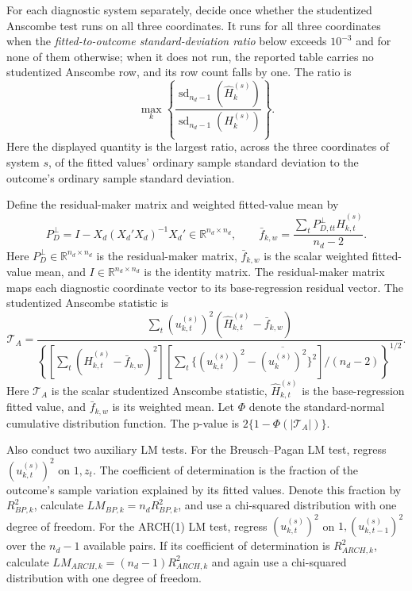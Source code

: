 \documentclass[11pt]{article}
\begin{document}
For each diagnostic system separately, decide once whether the studentized Anscombe test runs on all three
coordinates. It runs for all three coordinates when the \emph{fitted-to-outcome standard-deviation ratio} below exceeds \(10^{-3}\) and for none of them otherwise; when it does not
run, the reported table carries no studentized Anscombe row, and its row count falls by one. The ratio is
\[
\max_k\left\{\frac{\operatorname{sd}_{n_d-1}(\widehat H_k^{(s)})}
{\operatorname{sd}_{n_d-1}(H_k^{(s)})}\right\}.
\]
Here the displayed quantity is the largest ratio, across the three coordinates of system \(s\), of the fitted values'
ordinary sample standard deviation to the outcome's ordinary sample standard deviation.

Define the residual-maker matrix and weighted fitted-value mean by
\[
 P_D^\perp=I-X_d(X_d'X_d)^{-1}X_d'\in\mathbb R^{n_d\times n_d},
 \qquad
 \bar f_{k,w}=\frac{\sum_t P_{D,tt}^\perp\widehat H_{k,t}^{(s)}}{n_d-2}.
\]
Here \(P_D^\perp\in\mathbb R^{n_d\times n_d}\) is the residual-maker matrix,
\(\bar f_{k,w}\) is the scalar weighted fitted-value mean, and
\(I\in\mathbb R^{n_d\times n_d}\) is the identity matrix. The residual-maker matrix maps each
diagnostic coordinate vector to its base-regression residual vector.
The studentized Anscombe statistic is
\[
 \mathcal T_A=\frac{\sum_t(u_{k,t}^{(s)})^2(\widehat H_{k,t}^{(s)}-\bar f_{k,w})}
 {\left\{[\sum_t(\widehat H_{k,t}^{(s)}-\bar f_{k,w})^2]
 [\sum_t\{(u_{k,t}^{(s)})^2-\overline{(u_k^{(s)})^2}\}^2]/(n_d-2)\right\}^{1/2}}.
\]
Here \(\mathcal T_A\) is the scalar studentized Anscombe statistic,
\(\widehat H_{k,t}^{(s)}\) is the base-regression fitted value, and \(\bar f_{k,w}\) is its weighted mean.
Let \(\Phi\) denote the standard-normal cumulative distribution function. The p-value is
\(2\{1-\Phi(|\mathcal T_A|)\}\).

Also conduct two auxiliary LM tests. For the Breusch--Pagan LM test, regress
\((u_{k,t}^{(s)})^2\) on \(1,z_t\). The coefficient of determination is the fraction of the
outcome's sample variation explained by its fitted values. Denote this fraction by
\(R^2_{BP,k}\), calculate \(LM_{BP,k}=n_dR^2_{BP,k}\), and use a chi-squared distribution with one
degree of freedom. For the ARCH(1) LM test, regress \((u_{k,t}^{(s)})^2\) on
\(1,(u_{k,t-1}^{(s)})^2\) over the \(n_d-1\) available pairs. If its coefficient of
determination is \(R^2_{ARCH,k}\), calculate \(LM_{ARCH,k}=(n_d-1)R^2_{ARCH,k}\) and again use a
chi-squared distribution with one degree of freedom.
\end{document}
